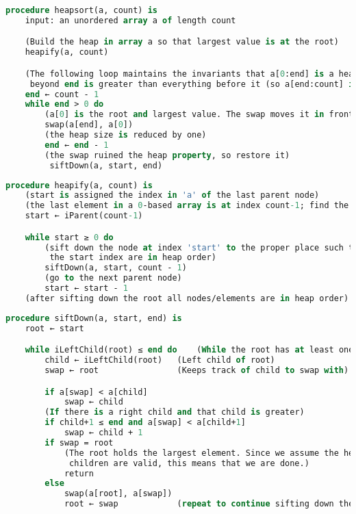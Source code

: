 \documentclass{article}
\begin{document}
\begin{lstlisting}[language=Pascal, caption=Heapsort Entry Method. \cite{wikiheap}]
procedure heapsort(a, count) is
    input: an unordered array a of length count

    (Build the heap in array a so that largest value is at the root)
    heapify(a, count)

    (The following loop maintains the invariants that a[0:end] is a heap and every element
     beyond end is greater than everything before it (so a[end:count] is in sorted order))
    end ← count - 1
    while end > 0 do
        (a[0] is the root and largest value. The swap moves it in front of the sorted elements.)
        swap(a[end], a[0])
        (the heap size is reduced by one)
        end ← end - 1
        (the swap ruined the heap property, so restore it)
         siftDown(a, start, end)
\end{lstlisting}

\begin{lstlisting}[language=Pascal, caption=Put elements of `a' in heap order; in-place. \cite{wikiheap}]
procedure heapify(a, count) is
    (start is assigned the index in 'a' of the last parent node)
    (the last element in a 0-based array is at index count-1; find the parent of that element)
    start ← iParent(count-1)

    while start ≥ 0 do
        (sift down the node at index 'start' to the proper place such that all nodes below
         the start index are in heap order)
        siftDown(a, start, count - 1)
        (go to the next parent node)
        start ← start - 1
    (after sifting down the root all nodes/elements are in heap order)
\end{lstlisting}
\begin{lstlisting}[language=Pascal, caption=Repair the heap whose root element is at index `start'; assuming the heaps rooted at its children are valid  \cite{wikiheap}]
procedure siftDown(a, start, end) is
    root ← start

    while iLeftChild(root) ≤ end do    (While the root has at least one child)
        child ← iLeftChild(root)   (Left child of root)
        swap ← root                (Keeps track of child to swap with)

        if a[swap] < a[child]
            swap ← child
        (If there is a right child and that child is greater)
        if child+1 ≤ end and a[swap] < a[child+1]
            swap ← child + 1
        if swap = root
            (The root holds the largest element. Since we assume the heaps rooted at the
             children are valid, this means that we are done.)
            return
        else
            swap(a[root], a[swap])
            root ← swap            (repeat to continue sifting down the child now)
\end{lstlisting}
\end{document}
